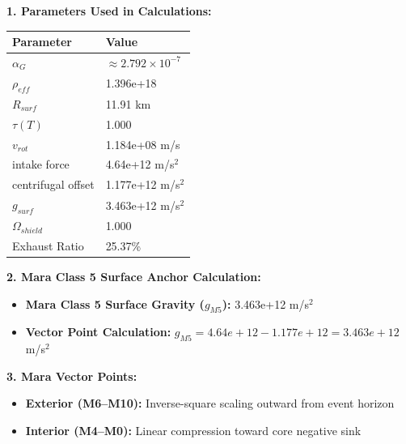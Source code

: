 \documentclass[11pt, a4paper]{article}
\begin{document}
\vspace{0.5em}
\noindent \textbf{1. Parameters Used in Calculations:}
\begin{center}
  \begin{tabular}{|l|l|}
    \hline
    \textbf{Parameter} & \textbf{Value} \\ \hline
    $\alpha_G$ & $\approx 2.792 \times 10^{-7}$ \\ \hline
    $\rho_{eff}$ & 1.396e+18 \\ \hline
    $R_{surf}$ & 11.91 km \\ \hline
    $\tau(T)$ & 1.000 \\ \hline
    $v_{rot}$ & 1.184e+08 m/s \\ \hline
    intake force & 4.64e+12 m/s$^2$ \\ \hline
    centrifugal offset & 1.177e+12 m/s$^2$ \\ \hline
    $g_{surf}$ & 3.463e+12 m/s$^2$ \\ \hline
    $\Omega_{shield}$ & 1.000 \\ \hline
    Exhaust Ratio & 25.37\% \\ \hline
  \end{tabular}
\end{center}

\vspace{0.5em}
\noindent \textbf{2. Mara Class 5 Surface Anchor Calculation:}
\begin{itemize}
  \item \textbf{Mara Class 5 Surface Gravity ($g_{M5}$):} 3.463e+12 m/s$^2$
  \item \textbf{Vector Point Calculation:} $g_{M5} = 4.64e+12 - 1.177e+12 = 3.463e+12$ m/s$^2$
\end{itemize}

\vspace{0.5em}
\noindent \textbf{3. Mara Vector Points:}
\begin{itemize}
  \item \textbf{Exterior (M6--M10):} Inverse-square scaling outward from event horizon
  \item \textbf{Interior (M4--M0):} Linear compression toward core negative sink
\end{itemize}
\end{document}
